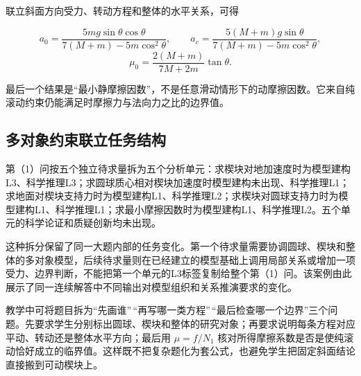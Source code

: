 \documentclass[
  12pt,
  a4paper,twoside,openany]{ctexbook}
\begin{document}
联立斜面方向受力、转动方程和整体的水平关系，可得

\[
a_0=\frac{5mg\sin\theta\cos\theta}
{7(M+m)-5m\cos^2\theta},
\qquad
a_c=\frac{5(M+m)g\sin\theta}
{7(M+m)-5m\cos^2\theta},
\]
\[
\mu_0=\frac{2(M+m)}{7M+2m}\tan\theta.
\]

最后一个结果是``最小静摩擦因数''，不是任意滑动情形下的动摩擦因数。它来自纯滚动约束仍能满足时摩擦力与法向力之比的边界值。

\subsection{多对象约束联立任务结构}\label{ux591aux5bf9ux8c61ux7ea6ux675fux8054ux7acbux4efbux52a1ux7ed3ux6784}

第（1）问按五个独立待求量拆为五个分析单元：求楔块对地加速度时为模型建构L3、科学推理L3；求圆球质心相对楔块加速度时模型建构未出现、科学推理L1；求地面对楔块支持力时为模型建构L1、科学推理L2；求楔块对圆球支持力时为模型建构L1、科学推理L1；求最小摩擦因数时为模型建构L1、科学推理L2。五个单元的科学论证和质疑创新均未出现。

这种拆分保留了同一大题内部的任务变化。第一个待求量需要协调圆球、楔块和整体的多对象模型，后续待求量则在已经建立的模型基础上调用局部关系或增加一项受力、边界判断，不能把第一个单元的L3标签复制给整个第（1）问。该案例由此展示了同一连续解答中不同输出对模型组织和关系推演要求的变化。

教学中可将题目拆为``先画谁''\,``再写哪一类方程''\,``最后检查哪一个边界''三个问题。先要求学生分别标出圆球、楔块和整体的研究对象；再要求说明每条方程对应平动、转动还是整体水平方向；最后用
\(\mu=f/N_1\)
核对所得摩擦系数是否是使纯滚动恰好成立的临界值。这样既不把复杂题化为套公式，也避免学生把固定斜面结论直接搬到可动楔块上。
\end{document}
